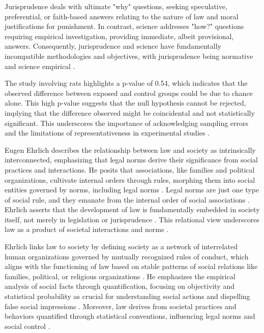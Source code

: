 Jurisprudence deals with ultimate "why" questions, seeking speculative, preferential, or faith-based answers relating to the nature of law and moral justifications for punishment. In contrast, science addresses "how?" questions requiring empirical investigation, providing immediate, albeit provisional, answers. Consequently, jurisprudence and science have fundamentally incompatible methodologies and objectives, with jurisprudence being normative and science empirical \cite{loevinger1949}.

The study involving rats highlights a p-value of 0.54, which indicates that the observed difference between exposed and control groups could be due to chance alone. This high p-value suggests that the null hypothesis cannot be rejected, implying that the difference observed might be coincidental and not statistically significant. This underscores the importance of acknowledging sampling errors and the limitations of representativeness in experimental studies \cite{nunes2018}.

Eugen Ehrlich describes the relationship between law and society as intrinsically interconnected, emphasizing that legal norms derive their significance from social practices and interactions. He posits that associations, like families and political organizations, cultivate internal orders through rules, morphing them into social entities governed by norms, including legal norms \cite{venturini2024}. Legal norms are just one type of social rule, and they emanate from the internal order of social associations \cite{venturini2024, venturini2024b}. Ehrlich asserts that the development of law is fundamentally embedded in society itself, not merely in legislation or jurisprudence \cite{venturini2024c}. This relational view underscores law as a product of societal interactions and norms \cite{venturini2024d}.

Ehrlich links law to society by defining society as a network of interrelated human organizations governed by mutually recognized rules of conduct, which aligns with the functioning of law based on stable patterns of social relations like families, political, or religious organizations \cite{venturini2024}. He emphasizes the empirical analysis of social facts through quantification, focusing on objectivity and statistical probability as crucial for understanding social actions and dispelling false social impressions \cite{sousa2024}. Moreover, law derives from societal practices and behaviors quantified through statistical conventions, influencing legal norms and social control \cite{ribeiro2021,sousa2024}.

